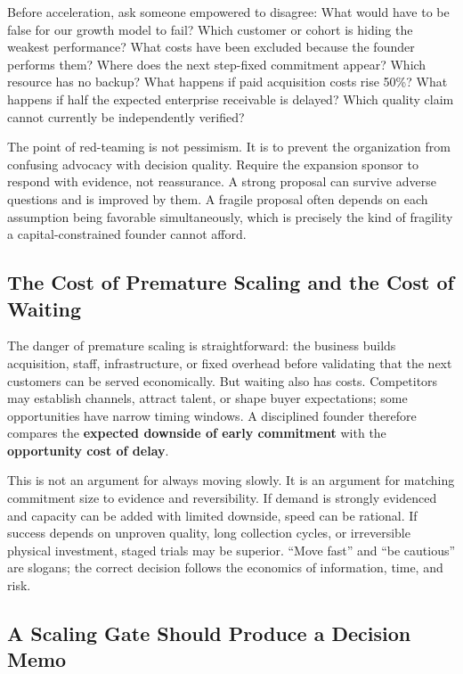 Before acceleration, ask someone empowered to disagree: What would have to be false for our growth model to fail? Which customer or cohort is hiding the weakest performance? What costs have been excluded because the founder performs them? Where does the next step-fixed commitment appear? Which resource has no backup? What happens if paid acquisition costs rise 50\%? What happens if half the expected enterprise receivable is delayed? Which quality claim cannot currently be independently verified?

The point of red-teaming is not pessimism. It is to prevent the organization from confusing advocacy with decision quality. Require the expansion sponsor to respond with evidence, not reassurance. A strong proposal can survive adverse questions and is improved by them. A fragile proposal often depends on each assumption being favorable simultaneously, which is precisely the kind of fragility a capital-constrained founder cannot afford.

\subsection{The Cost of Premature Scaling and the Cost of Waiting}
\label{sec:cost_of_premature_scaling_vs_waiting}

The danger of premature scaling is straightforward: the business builds acquisition, staff, infrastructure, or fixed overhead before validating that the next customers can be served economically. But waiting also has costs. Competitors may establish channels, attract talent, or shape buyer expectations; some opportunities have narrow timing windows. A disciplined founder therefore compares the \textbf{expected downside of early commitment} with the \textbf{opportunity cost of delay}.

This is not an argument for always moving slowly. It is an argument for matching commitment size to evidence and reversibility. If demand is strongly evidenced and capacity can be added with limited downside, speed can be rational. If success depends on unproven quality, long collection cycles, or irreversible physical investment, staged trials may be superior. ``Move fast'' and ``be cautious'' are slogans; the correct decision follows the economics of information, time, and risk.

\subsection{A Scaling Gate Should Produce a Decision Memo}
\label{sec:scaling_gate_decision_memo}

